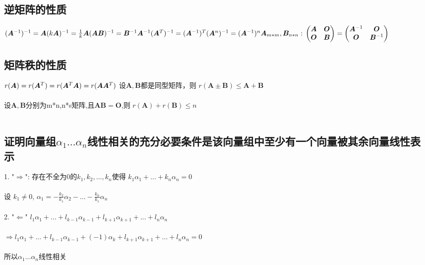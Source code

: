 \documentclass[12pt]{article}
\begin{document}
\subsection{逆矩阵的性质}
\(
(\bm{A}^{-1})^{-1}=\bm{A} \\ \\
(k \bm{A})^{-1}=\frac{1}{k}\bm{A} \\ \\
(\bm{A}\bm{B})^{-1}=\bm{B}^{-1}\bm{A}^{-1} \\ \\
(\bm{A}^T)^{-1}=(\bm{A}^{-1})^T \\ \\
(\bm{A}^n)^{-1}=(\bm{A}^{-1})^n \\ \\
\bm{A}_{m*m},\bm{B}_{n*n}: \\ \\ 
\begin{pmatrix}
	\bm{A} & \bm{O} \\
	\bm{O} & \bm{B}
\end{pmatrix}
=
\begin{pmatrix}
	\bm{A}^{-1} & \bm{O} \\
	\bm{O} & \bm{B}^{-1}
\end{pmatrix}
\)
\subsection{矩阵秩的性质}
\(
r( \bm{A} )=r( \bm{A}^T )=r( \bm{A}^T \bm{A} )=r( \bm{A} \bm{A} ^T) \\ \\
\)
设$\bm{A},\bm{B} $都是同型矩阵，则 $r( \bm{A} \pm \bm{B}) \leq \bm{A}+\bm{B}$  \\ \\
设$ \bm{A},\bm{B}$分别为m*n,n*s矩阵,且$\bm{A}\bm{B}=\bm{O}$,则 $r(\bm{A})+r(\bm{B}) \leq n $\\ \\
\subsection{证明向量组$\alpha_1...\alpha_n$线性相关的充分必要条件是该向量组中至少有一个向量被其余向量线性表示}
1. "$\Rightarrow$": 存在不全为0的$k_1,k_2,..., k_n$使得 $k_1\alpha_1+...+ k_n \alpha_n=0$ \\ \\
设 $k_1\neq 0$,  $\alpha_1=-\frac{k_2}{k_1}\alpha_2-...-\frac{k_n}{k_1}\alpha_n$ \\ \\
2. "$\Leftarrow$" $l_1\alpha_1+...+l_{k-1}\alpha_{k-1}+l_{k+1}\alpha_{k+1}+...+l_n\alpha_n$ \\ \\
  $\Rightarrow l_1\alpha_1+...+l_{k-1}\alpha_{k-1}+(-1)\alpha_k+l_{k+1}\alpha_{k+1}+...+l_n\alpha_n=0$ \\ \\
 所以$\alpha_1...\alpha_n$线性相关 \\ \\
\end{document}
